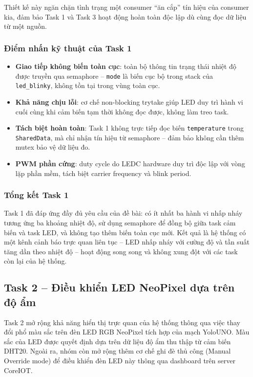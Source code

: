 Thiết kế này ngăn chặn tình trạng một consumer ``ăn cắp'' tín hiệu của consumer kia, đảm bảo Task 1 và Task 3 hoạt động hoàn toàn độc lập dù cùng đọc dữ liệu từ một nguồn.

\subsubsection*{Điểm nhấn kỹ thuật của Task 1}

\begin{itemize}
    \item \textbf{Giao tiếp không biến toàn cục}: toàn bộ thông tin trạng thái nhiệt độ được truyền qua semaphore -- \texttt{mode} là biến cục bộ trong stack của \texttt{led\_blinky}, không tồn tại trong vùng toàn cục.
    \item \textbf{Khả năng chịu lỗi}: cơ chế non-blocking trytake giúp LED duy trì hành vi cuối cùng khi cảm biến tạm thời không đọc được, không làm treo task.
    \item \textbf{Tách biệt hoàn toàn}: Task 1 không trực tiếp đọc biến \texttt{temperature} trong \texttt{SharedData}, mà chỉ nhận tín hiệu từ semaphore -- đảm bảo không cần thêm mutex bảo vệ dữ liệu đo.
    \item \textbf{PWM phần cứng}: duty cycle do LEDC hardware duy trì độc lập với vòng lặp phần mềm, tách biệt carrier frequency và blink period.
\end{itemize}

\subsubsection*{Tổng kết Task 1}

Task 1 đã đáp ứng đầy đủ yêu cầu của đề bài: có ít nhất ba hành vi nhấp nháy tương ứng ba khoảng nhiệt độ, sử dụng semaphore để đồng bộ giữa task cảm biến và task LED, và không tạo thêm biến toàn cục mới. Kết quả là hệ thống có một kênh cảnh báo trực quan liên tục -- LED nhấp nháy với cường độ và tần suất tăng dần theo nhiệt độ -- hoạt động song song và không xung đột với các task còn lại của hệ thống.

\subsection{Task 2 -- Điều khiển LED NeoPixel dựa trên độ ẩm}

Task 2 mở rộng khả năng hiển thị trực quan của hệ thống thông qua việc thay đổi phổ màu sắc trên đèn LED RGB NeoPixel tích hợp của mạch YoloUNO. Màu sắc của LED được quyết định dựa trên dữ liệu độ ẩm thu thập từ cảm biến DHT20. Ngoài ra, nhóm còn mở rộng thêm cơ chế ghi đè thủ công (Manual Override mode) để điều khiển đèn LED này thông qua dashboard trên server CoreIOT.

